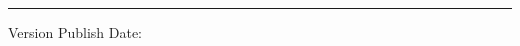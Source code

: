 
%
\begin{titlepage}
	\flushright
	\hfill
	\vfill
	{\LARGE\thesisTitle \par}
    \rule[5pt]{\textwidth}{.4pt} \par
    Version \thesisVersion
    \vfill
	Publish Date: \textit{\large\thesisDate} \\
	
\end{titlepage}



